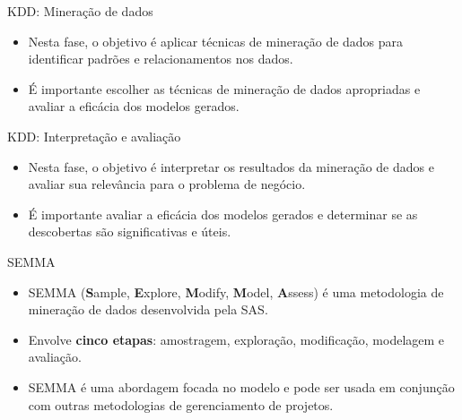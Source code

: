 \documentclass[
  ignorenonframetext,
  aspectratio=169,
]{beamer}
\providecommand{\tightlist}{%
  \setlength{\itemsep}{0pt}\setlength{\parskip}{0pt}}
\begin{document}
\begin{frame}{KDD: Mineração de dados}
\label{kdd-minerauxe7uxe3o-de-dados}
\begin{itemize}
\tightlist
\item
  Nesta fase, o objetivo é aplicar técnicas de mineração de dados para
  identificar padrões e relacionamentos nos dados.
\end{itemize}

\pause

\begin{itemize}
\tightlist
\item
  É importante escolher as técnicas de mineração de dados apropriadas e
  avaliar a eficácia dos modelos gerados.
\end{itemize}
\end{frame}

\begin{frame}{KDD: Interpretação e avaliação}
\label{kdd-interpretauxe7uxe3o-e-avaliauxe7uxe3o}
\begin{itemize}
\tightlist
\item
  Nesta fase, o objetivo é interpretar os resultados da mineração de
  dados e avaliar sua relevância para o problema de negócio.
\end{itemize}

\pause

\begin{itemize}
\tightlist
\item
  É importante avaliar a eficácia dos modelos gerados e determinar se as
  descobertas são significativas e úteis.
\end{itemize}
\end{frame}

\begin{frame}{SEMMA}
\label{semma}
\begin{itemize}
\tightlist
\item
  SEMMA (\textbf{S}ample, \textbf{E}xplore, \textbf{M}odify,
  \textbf{M}odel, \textbf{A}ssess) é uma metodologia de mineração de
  dados desenvolvida pela SAS.
\end{itemize}

\pause

\begin{itemize}
\tightlist
\item
  Envolve \textbf{cinco etapas}: amostragem, exploração, modificação,
  modelagem e avaliação.
\end{itemize}

\pause

\begin{itemize}
\tightlist
\item
  SEMMA é uma abordagem focada no modelo e pode ser usada em conjunção
  com outras metodologias de gerenciamento de projetos.
\end{itemize}
\end{frame}
\end{document}
